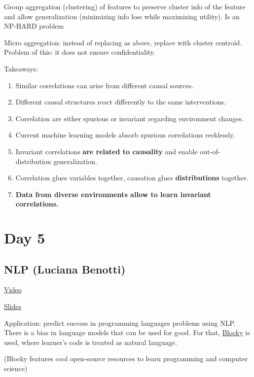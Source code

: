 \documentclass[12pt, english]{article}
\begin{document}
Group aggregation (clustering) of features to preserve cluster info of the feature and allow generalization (minimizing info loss while maximizing utility). Is an NP-HARD problem

Micro aggregation: instead of replacing as above, replace with cluster centroid. Problem of this: it does not ensure confidentiality.

Takeaways:

\begin{enumerate}
  \item Similar correlations can arise from different causal sources.
  \item Different causal structures react differently to the same interventions.
  \item Correlation are either spurious or invariant regarding environment changes.
  \item Current machine learning models absorb spurious correlations recklessly.
  \item Invariant correlations \textbf{are related to causality} and enable out-of-distribution generalization.
  \item Correlation glues variables together, causation glues \textbf{distributions} together.
  \item \textbf{Data from diverse environments allow to learn invariant correlations.}
\end{enumerate}

\section{Day 5}

\subsection{NLP (Luciana Benotti)}
\href{http://tv.vera.com.uy/video/55551}{Video}

\href{https://docs.google.com/presentation/d/1md3eghCXGzdwHjEFmyhDweQ-dn9S_fKzR8yhQXhi8Ig/edit?usp=sharing}{Slides}

Application: predict success in programming languages problems using NLP. There is a bias in language models that can be used for good. For that, \href{https://studio.code.org/courses}{Blocky} is used, where learner's code is treated as natural language.

(Blocky features cool open-source resources to learn programming and computer science)
\end{document}
